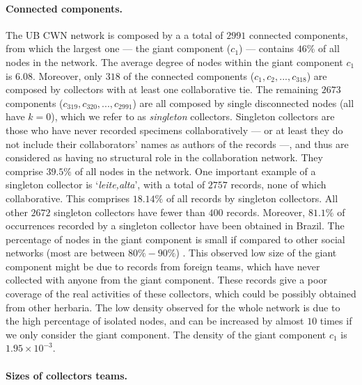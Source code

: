 \paragraph*{Connected components.}
The UB CWN network is composed by a a total of $2991$ connected components, from which the largest one --- the giant component ($c_1$) ---  contains $46\%$ of all nodes in the network.
The average degree of nodes within the giant component $c_1$ is $6.08$.
%
Moreover, only $318$ of the connected components ($c_1, c_2, ..., c_{318}$) are composed by collectors with at least one collaborative tie.
The remaining $2673$ components ($c_{319}, c_{320}, ..., c_{2991}$) are all composed by single disconnected nodes (all have $k=0$), which we refer to as \textit{singleton} collectors.
Singleton collectors are those who have never recorded specimens collaboratively --- or at least they do not include their collaborators' names as authors of the records ---, and thus are considered as having no structural role in the collaboration network.
They comprise $39.5\%$ of all nodes in the network.
%
One important example of a singleton collector is `\textit{leite,alta}', with a total of $2757$ records, none of which collaborative.  %
This comprises $18.14\%$ of all records by singleton collectors.
All other $2672$ singleton collectors have fewer than $400$ records.
Moreover, $81.1\%$ of occurrences recorded by a singleton collector have been obtained in Brazil.
%
The percentage of nodes in the giant component is small if compared to other social networks (most are between $80\% - 90\%$) \cite{Newman}. 
This observed low size of the giant component might be due to records from foreign teams, which have never collected with anyone from the giant component. 
These records give a poor coverage of the real activities of these collectors, which could be possibly obtained from other herbaria.
%
The low density observed for the whole network is due to the high percentage of isolated nodes, and can be increased by almost $10$ times if we only consider the giant component. 
The density of the giant component $c_1$ is $1.95 \times 10^{-3}$.

\paragraph*{Sizes of collectors teams.}

